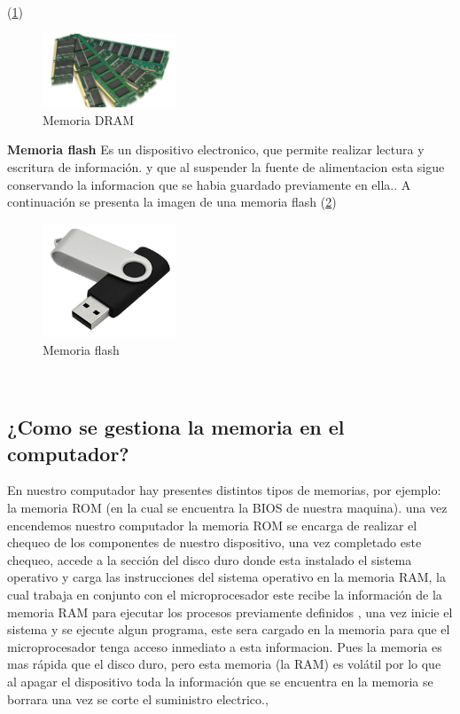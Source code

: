 \documentclass{article}
\begin{document}
(\ref{fig:memoria-DRAM})
\begin{figure}[h]
\includegraphics[width=4cm]{dram.jpg}\centering
\caption{Memoria DRAM}
\label{fig:memoria-DRAM}
\end{figure}
\newline
\newline
\textbf{Memoria flash}
Es un dispositivo electronico, que permite realizar lectura y escritura de información. y que al suspender la fuente de alimentacion esta sigue conservando la informacion que se habia guardado previamente en ella.\cite{flash}.
\newline
\newline
A continuación se presenta la imagen de una memoria flash
(\ref{fig:memoria-flash})
\begin{figure}[h]
\includegraphics[width=4cm]{memoria-flash.jpg}\centering
\caption{Memoria flash}
\label{fig:memoria-flash}
\end{figure}
\newline
\newline
\

\subsection{¿Como se gestiona la memoria en el computador?}
En nuestro computador hay presentes distintos tipos de memorias, por ejemplo: la memoria ROM (en la cual se encuentra la BIOS de nuestra maquina). una vez encendemos nuestro computador la memoria ROM se encarga de realizar el chequeo de los componentes de nuestro dispositivo, una vez completado este chequeo, accede a la sección del disco duro donde esta instalado el sistema operativo y carga las instrucciones del sistema operativo en la memoria RAM, la cual  trabaja en conjunto con el microprocesador este recibe la información de la memoria RAM para ejecutar los procesos previamente definidos , una vez inicie el sistema y se ejecute algun programa, este sera cargado en la memoria para que el microprocesador tenga acceso inmediato a esta informacion. Pues la memoria es mas rápida que el disco duro, pero esta memoria (la RAM) es volátil por lo que al apagar el dispositivo toda la información que se encuentra en la memoria se borrara una vez se corte el suministro electrico.\cite{Guia},\cite{Gestion}
\newline
\end{document}
